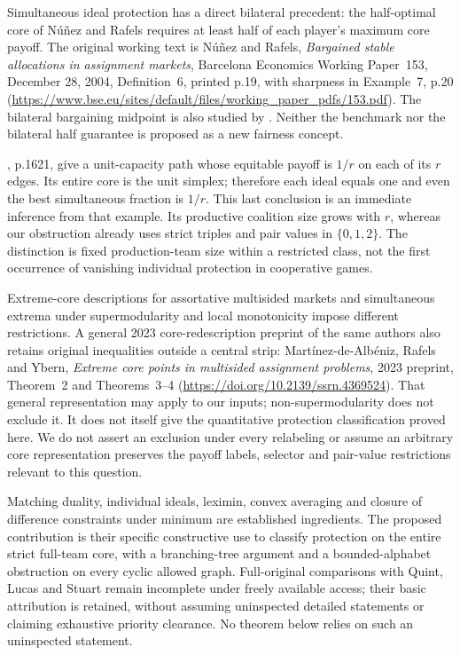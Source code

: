\documentclass[11pt]{article}
\theoremstyle{remark}\newtheorem{remark}[theorem]{Remark}
\begin{document}
Simultaneous ideal protection has a direct bilateral precedent: the
half-optimal core of N\'u\~nez and Rafels requires at least half of each
player's maximum core payoff. The original working text is N\'u\~nez and
Rafels, \emph{Bargained stable allocations in assignment markets}, Barcelona
Economics Working Paper~153, December 28, 2004, Definition~6, printed p.19,
with sharpness in Example~7, p.20
(\url{https://www.bse.eu/sites/default/files/working_paper_pdfs/153.pdf}).
The bilateral bargaining midpoint is also studied by
\citet{NunezRafels2008}. Neither the benchmark nor the bilateral half guarantee
is proposed as a new fairness concept.

\citet{Gangam2026}, p.1621, give a unit-capacity path whose equitable payoff
is $1/r$ on each of its $r$ edges. Its entire core is the unit simplex;
therefore each ideal equals one and even the best simultaneous fraction is
$1/r$. This last conclusion is an immediate inference from that example.
Its productive coalition size grows with $r$, whereas our obstruction already
uses strict triples and pair values in $\{0,1,2\}$. The distinction is fixed
production-team size within a restricted class, not the first occurrence of
vanishing individual protection in cooperative games.

Extreme-core descriptions for assortative multisided markets
\citep{Martinez2020} and simultaneous extrema under supermodularity and local
monotonicity \citep{Martinez2026} impose different restrictions. A general
2023 core-redescription preprint of the same authors also retains original
inequalities outside a central strip: Mart\'inez-de-Alb\'eniz, Rafels and
Ybern, \emph{Extreme core points in multisided assignment problems}, 2023
preprint, Theorem~2 and Theorems~3--4
(\url{https://doi.org/10.2139/ssrn.4369524}).
That general representation may apply to our inputs; non-supermodularity
does not exclude it. It does not itself give the quantitative protection
classification proved here. We do not assert an exclusion under every
relabeling or assume an arbitrary core representation preserves the payoff
labels, selector and pair-value restrictions relevant to this question.

Matching duality, individual ideals, leximin, convex averaging and closure
of difference constraints under minimum are established ingredients. The
proposed contribution is their specific constructive use to classify
protection on the entire strict full-team core, with a branching-tree
argument and a bounded-alphabet obstruction on every cyclic allowed graph.
Full-original comparisons with Quint, Lucas and Stuart remain incomplete
under freely available access; their basic attribution is retained, without
assuming uninspected detailed statements or claiming exhaustive priority
clearance. No theorem below relies on such an uninspected statement.
\end{document}
